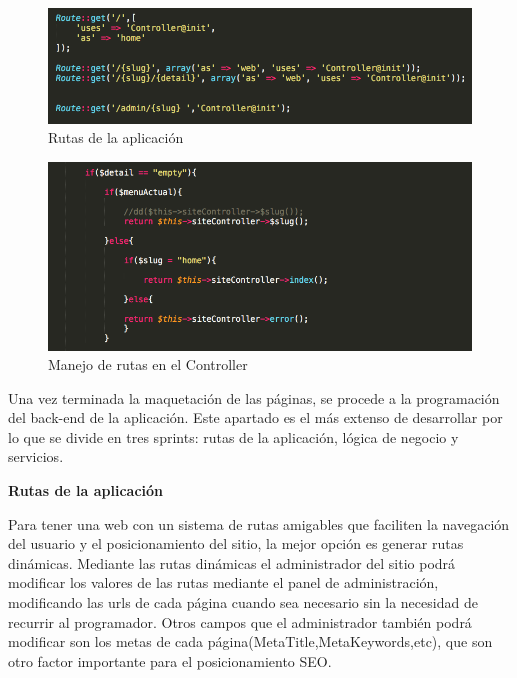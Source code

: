 \begin{figure}
\begin{center}
\includegraphics[width=1.0\textwidth]{imagenes/routes.png}
\caption{Rutas de la aplicación}
\label{rutas-app}
\end{center}
\end{figure}

\begin{figure}
\begin{center}
\includegraphics[width=1.0\textwidth]{imagenes/controller.png}
\caption{Manejo de rutas en el Controller}
\label{controller-app}
\end{center}
\end{figure}

Una vez terminada la maquetación de las páginas, se procede a la programación del back-end de la aplicación. Este apartado es el más extenso de desarrollar por lo que se divide en tres sprints: rutas de la aplicación, lógica de negocio y servicios.

\vspace{5 mm}


\textbf{Rutas de la aplicación}

Para tener una web con un sistema de rutas amigables que faciliten la navegación del usuario y el posicionamiento del sitio, la mejor opción es generar rutas dinámicas. Mediante las rutas dinámicas el administrador del sitio podrá modificar los valores de las rutas mediante el panel de administración, modificando las urls de cada página cuando sea necesario sin la necesidad de recurrir al programador. Otros campos que el administrador también podrá modificar son los metas de cada página(MetaTitle,MetaKeywords,etc), que son otro factor importante para el posicionamiento SEO.

